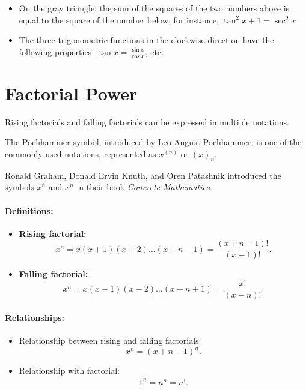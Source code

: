 \documentclass[11pt]{../../TexTemplate/elegantbook}
\begin{document}
\begin{remark}
    \begin{itemize}
        \item On the gray triangle, the sum of the squares of the two numbers above is equal to the square of the number below,
            for instance, \(\tan^{2} x + 1 = \sec^{2}x\)
        \item The three trigonometric functions in the clockwise direction have the following properties: 
            $\tan x = \frac{\sin x}{\cos x}$, etc.
    \end{itemize}
\end{remark}

\section{Factorial Power}
\begin{definition}
    Rising factorials and falling factorials can be expressed in multiple notations.

    The Pochhammer symbol, introduced by Leo August Pochhammer, is one of the commonly used notations, 
    represented as \( x^{(n)} \) or \( (x)_n \).

    Ronald Graham, Donald Ervin Knuth, and Oren Patashnik introduced the symbols 
    \( x^{\bar{n}} \) and \( x^{\underline{n}} \) in their book \textit{Concrete Mathematics}.

    \paragraph{Definitions:}
    \begin{itemize}
        \item \textbf{Rising factorial:}
        \[
        x^{\bar{n}} = x(x+1)(x+2)\dots(x+n-1) = \frac{(x+n-1)!}{(x-1)!}.
        \]
        \item \textbf{Falling factorial:}
        \[
        x^{\underline{n}} = x(x-1)(x-2)\dots(x-n+1) = \frac{x!}{(x-n)!}.
        \]
    \end{itemize}

    \paragraph{Relationships:}
    \begin{itemize}
        \item Relationship between rising and falling factorials:
        \[
        x^{\bar{n}} = (x+n-1)^{\underline{n}}.
        \]
        \item Relationship with factorial:
        \[
        1^{\bar{n}} = n^{\underline{n}} = n!.
        \]
    \end{itemize}
\end{definition}
\end{document}
